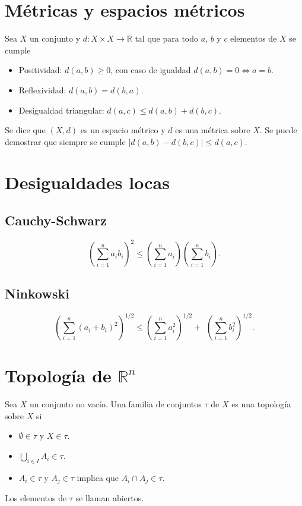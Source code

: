 \documentclass{article}
\begin{document}
\section*{Métricas y espacios métricos}

Sea $X$ un conjunto y $d:X\times X\to \mathbb{R}$ tal que para todo $a$, $b$ y $c$ elementos de $X$ se cumple
\begin{itemize}

\item Positividad: $d(a,b)\geq 0$, con caso de igualdad $d(a,b)=0\iff a=b$.

\item Reflexividad: $d(a,b)=d(b,a)$.

\item Desigualdad triangular: $d(a,c)\leq d(a,b)+d(b,c)$.

\end{itemize}
Se dice que $(X,d)$ es un espacio métrico y $d$ es una métrica sobre $X$. Se puede demostrar que siempre se cumple $|d(a,b)-d(b,c)|\leq d(a,c)$.

\section*{Desigualdades locas}

\subsection*{Cauchy-Schwarz}

$$\left(\sum_{i=1}^{n}a_ib_i\right)^2\leq\left(\sum_{i=1}^{n}a_i\right)\left(\sum_{i=1}^{n}b_i\right).$$
\subsection*{Ninkowski}

$$\left(\sum_{i=1}^{n}(a_i+b_i)^2\right)^{1/2}\leq\left(\sum_{i=1}^{n}a_i^2\right)^{1/2}+\phantom{^{1}}\left(\sum_{i=1}^{n}b_i^2\right)^{1/2}.$$

\section*{Topología de $\mathbb{R}^n$}

Sea $X$ un conjunto no vacío. Una familia de conjuntos $\tau$ de $X$ es una topología sobre $X$ si
\begin{itemize}

\item $\emptyset\in\tau$ y $X\in\tau$.

\item $\displaystyle\bigcup_{i\in I} A_i\in\tau$.

\item $A_i\in\tau$ y $A_j\in\tau$ implica que $A_i\cap A_j\in\tau$.

\end{itemize}
Los elementos de $\tau$ se llaman abiertos.
\end{document}
